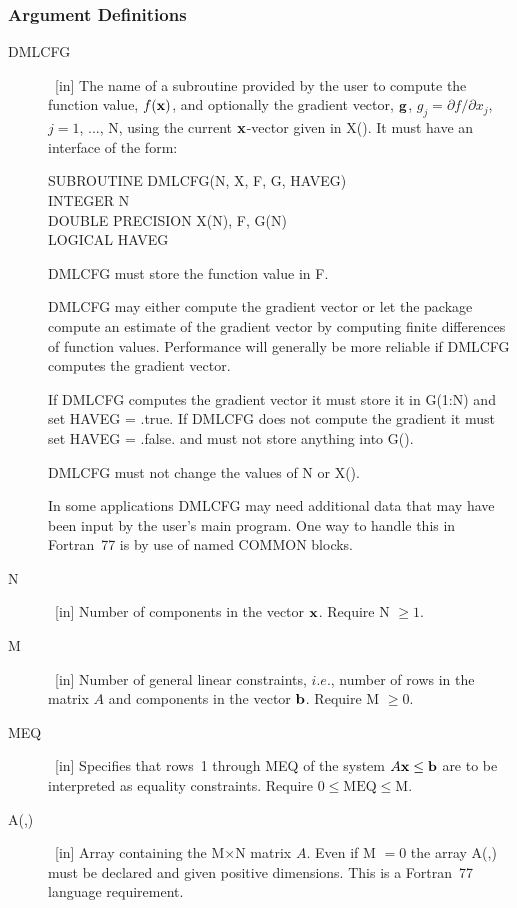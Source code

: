 \documentclass[twoside]{MATH77}
\begin{document}
\subsubsection{Argument Definitions}
\begin{description}
\item[DMLCFG]  \ [in] The name of a subroutine provided by the user to
compute the function value, $f({\bf x})$, and optionally the gradient
vector, ${\bf g}$, $g_j=\partial f/\partial x_j$, $j=1$, ..., N,
using the current ${\bf x}$-vector given in X(). It must have an interface
of the form:
{\tt \begin{tabbing}
SUBROUTINE DMLCFG(N, X, F, G, HAVEG)\\
INTEGER N\\
DOUBLE PRECISION X(N), F, G(N)\\
LOGICAL HAVEG
\end{tabbing}}
DMLCFG must store the function value in F.

DMLCFG may either compute the gradient vector or let the package compute an
estimate of the gradient vector by computing finite differences of function
values. Performance will generally be more reliable if DMLCFG computes the
gradient vector.

If DMLCFG computes the gradient vector it must store it in G(1:N) and set
HAVEG = .true. If DMLCFG does not compute the gradient it must set HAVEG =
.false. and must not store anything into G().

DMLCFG must not change the values of N or X().

In some applications DMLCFG may need additional data that may have been
input by the user's main program. One way to handle this in Fortran~77 is by
use of named COMMON blocks.

\item[N]  \ [in] Number of components in the vector ${\bf x}$. Require N $\geq
1.$

\item[M]  \ [in] Number of general linear constraints, $i.e.$, number of
rows in the matrix $A$ and components in the vector ${\bf b}$. Require
M $\geq 0.$

\item[MEQ]  \ [in] Specifies that rows~1 through MEQ of the system $A{\bf x} %
\leq {\bf b}$ are to be interpreted as equality constraints. Require $0\leq
\text{MEQ}\leq \text{M}.$

\item[A(,)]  \ [in] Array containing the M$\times $N matrix $A$. Even if M $=0$
the array A(,) must be declared and given positive dimensions. This is a
Fortran~77 language requirement.


\end{description}
\end{document}
